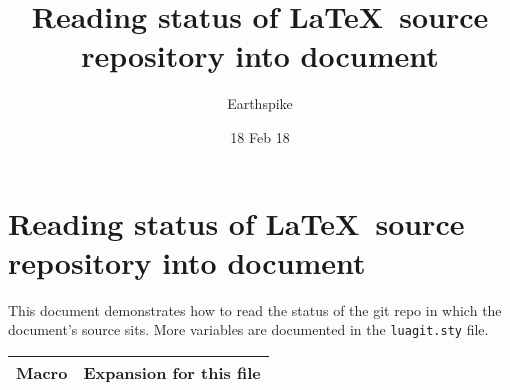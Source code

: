 \documentclass[a4paper]{article}
\title{Reading status of \LaTeX\ source repository into document}
\author{Earthspike}
\date{18 Feb 18}
\begin{document}
\begin{titlepage}
\maketitle
\end{titlepage}


\section{Reading status of \LaTeX\ source repository into document}

This document demonstrates how to read the status of the git repo in
which the document's source sits. More variables are documented in the
\verb|luagit.sty| file.

\begin{tabular}{ll}
  Macro & Expansion for this file \\\hline
  

\end{tabular}
\end{document}
